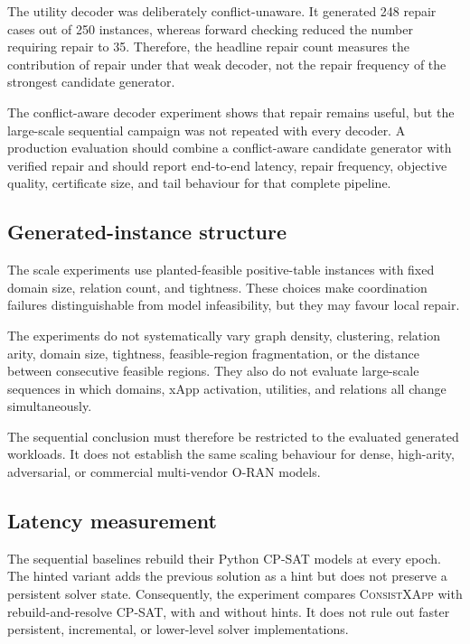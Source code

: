 \documentclass[pdflatex,sn-mathphys-num,iicol,oneside]{sn-jnl}
\newcommand{\method}{\textsc{ConsistXApp}\xspace}
\newcommand{\cpsat}{\textsc{CP-SAT}\xspace}
\begin{document}
The utility decoder was deliberately conflict-unaware. It generated
248 repair cases out of 250 instances, whereas forward checking
reduced the number requiring repair to 35. Therefore, the headline
repair count measures the contribution of repair under that weak
decoder, not the repair frequency of the strongest candidate generator.

The conflict-aware decoder experiment shows that repair remains useful,
but the large-scale sequential campaign was not repeated with every
decoder. A production evaluation should combine a conflict-aware
candidate generator with verified repair and should report end-to-end
latency, repair frequency, objective quality, certificate size, and
tail behaviour for that complete pipeline.

\subsection{Generated-instance structure}

The scale experiments use planted-feasible positive-table instances
with fixed domain size, relation count, and tightness. These choices
make coordination failures distinguishable from model infeasibility,
but they may favour local repair.

The experiments do not systematically vary graph density, clustering,
relation arity, domain size, tightness, feasible-region fragmentation,
or the distance between consecutive feasible regions. They also do
not evaluate large-scale sequences in which domains, xApp activation,
utilities, and relations all change simultaneously.

The sequential conclusion must therefore be restricted to the
evaluated generated workloads. It does not establish the same scaling
behaviour for dense, high-arity, adversarial, or commercial
multi-vendor O-RAN models.

\subsection{Latency measurement}

The sequential baselines rebuild their Python \cpsat models at every
epoch. The hinted variant adds the previous solution as a hint but
does not preserve a persistent solver state. Consequently, the
experiment compares \method with rebuild-and-resolve \cpsat, with and
without hints. It does not rule out faster persistent, incremental, or
lower-level solver implementations.
\end{document}
